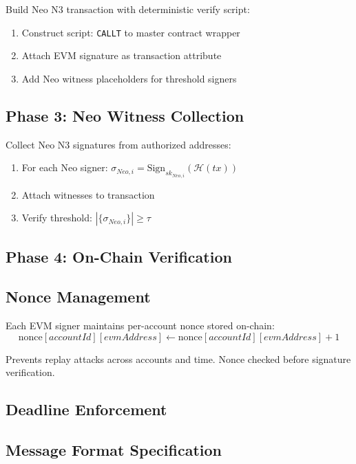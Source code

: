\documentclass[10pt,twocolumn]{article}
\newcommand{\hash}[1]{\mathcal{H}(#1)}
\begin{document}
Build Neo N3 transaction with deterministic verify script:
\begin{enumerate}[leftmargin=*,topsep=2pt,itemsep=1pt]
\item Construct script: \texttt{CALLT} to master contract wrapper
\item Attach EVM signature as transaction attribute
\item Add Neo witness placeholders for threshold signers
\end{enumerate}

\subsection{Phase 3: Neo Witness Collection}

Collect Neo N3 signatures from authorized addresses:
\begin{enumerate}[leftmargin=*,topsep=2pt,itemsep=1pt]
\item For each Neo signer: $\sigma_{Neo,i} = \text{Sign}_{sk_{Neo,i}}(\hash{tx})$
\item Attach witnesses to transaction
\item Verify threshold: $|\{\sigma_{Neo,i}\}| \geq \tau$
\end{enumerate}

\subsection{Phase 4: On-Chain Verification}

\subsection{Nonce Management}

Each EVM signer maintains per-account nonce stored on-chain:
$$\text{nonce}[accountId][evmAddress] \gets \text{nonce}[accountId][evmAddress] + 1$$

Prevents replay attacks across accounts and time. Nonce checked before signature verification.

\subsection{Deadline Enforcement}

\subsection{Message Format Specification}
\end{document}
